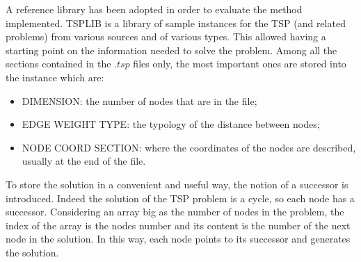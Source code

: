 \label{sec:solution-data-management}
A reference library has been adopted in order to evaluate the method implemented. TSPLIB \cite{tsp-lib} is a library of sample instances for the TSP (and related problems) from various sources and of various types. This allowed having a starting point on the information needed to solve the problem. Among all the sections contained in the $.tsp$ files only, the most important ones are stored into the instance which are:
\begin{itemize}
	\item DIMENSION: the number of nodes that are in the file;
	\item EDGE WEIGHT TYPE: the typology of the distance between nodes;
	\item NODE COORD SECTION: where the coordinates of the nodes are described, usually at the end of the file.
\end{itemize}

To store the solution in a convenient and useful way, the notion of a successor is introduced. Indeed the solution of the TSP problem is a cycle, so each node has a successor. Considering an array big as the number of nodes in the problem, the index of the array is the nodes number and its content is the number of the next node in the solution. In this way, each node points to its successor and generates the solution.